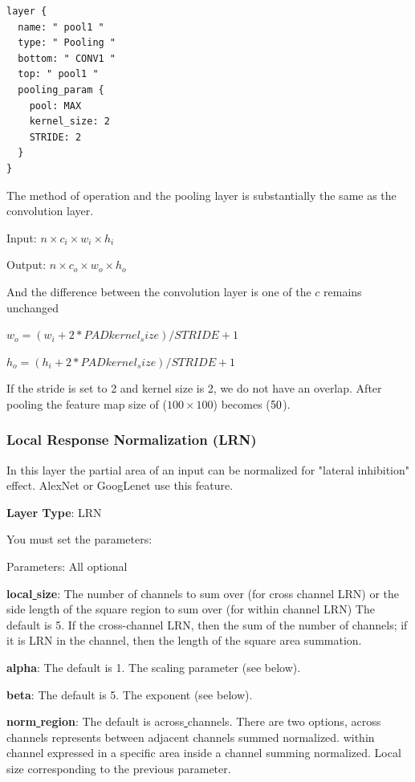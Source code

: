 \documentclass[12pt]{article}
\begin{document}
\begin{lstlisting}[style=json, frame=single]
layer {
  name: " pool1 "
  type: " Pooling "
  bottom: " CONV1 "
  top: " pool1 "
  pooling_param {
    pool: MAX
    kernel_size: 2
    STRIDE: 2
  }
}
\end{lstlisting}

\noindent The method of operation and the pooling layer is substantially the same as the convolution layer.

\noindent Input: $n \times c_{i} \times w_{i} \times h_{i}$

\noindent Output: $n \times c_{o} \times w_{o} \times h_{o}$


\noindent And the difference between the convolution layer is one of the $c$ remains unchanged

\noindent $w_{o} = (w_{i} + 2 * PAD kernel_size) / STRIDE + 1$

\noindent $h_{o} = (h_{i} + 2 * PAD kernel_size) / STRIDE + 1$

\noindent If the stride is set to 2 and kernel size is 2, we do not have an overlap. After pooling the feature map size of ($100 \times 100$) becomes ($50 \time 50$).

\subsubsection{Local Response Normalization (LRN)}

In this layer the partial area of ​​an input can be normalized for "lateral inhibition" effect. AlexNet or GoogLenet use this feature.

\noindent \textbf{Layer Type}: LRN

\noindent You must set the parameters:

\noindent Parameters: All optional

\noindent \textbf{local\underline{{ }{ }}size}: The number of channels to sum over (for cross channel LRN) or the side length of the square region to sum over (for within channel LRN) The default is 5. If the cross-channel LRN, then the sum of the number of channels; if it is LRN in the channel, then the length of the square area summation.

\noindent \textbf{alpha}: The default is 1.  The scaling parameter (see below).

\noindent \textbf{beta}: The default is 5. The exponent (see below).

\noindent \textbf{norm\underline{{ }{ }}region}: The default is across\underline{{ }{ }}channels. There are two options, across\underline{{ }{ }}channels represents between adjacent channels summed normalized. within\underline{{ }{ }}channel expressed in a specific area inside a channel summing normalized. Local\underline{{ }{ }}size corresponding to the previous parameter.
\end{document}
